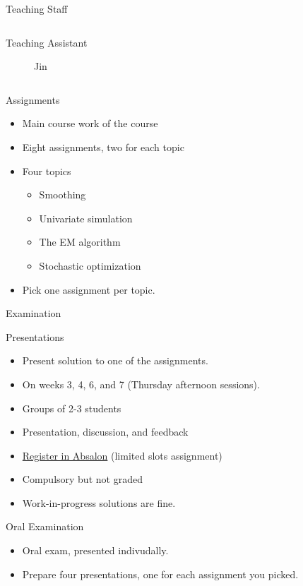 \documentclass[
  ignorenonframetext,
  aspectratio=1610,
  onlytextwidth]{beamer}
\providecommand{\tightlist}{}
\begin{document}
\begin{frame}{Teaching Staff}
\begin{columns}[T]
\begin{column}{0.47\linewidth}
\begin{block}{Teaching Assistant}
\begin{figure}[H]
{}

\caption{Jin}

\end{figure}%
\end{block}
\end{column}
\end{columns}
\end{frame}

\begin{frame}{Assignments}
\label{assignments}
\begin{itemize}[<+->]
\tightlist
\item
  Main course work of the course
\item
  Eight assignments, two for each topic
\item
  Four topics

  \begin{itemize}[<+->]
  \tightlist
  \item
    Smoothing
  \item
    Univariate simulation
  \item
    The EM algorithm
  \item
    Stochastic optimization
  \end{itemize}
\item
  Pick one assignment per topic.
\end{itemize}
\end{frame}

\begin{frame}{Examination}
\label{examination}
\begin{block}{Presentations}
\label{presentations}
\begin{itemize}[<+->]
\tightlist
\item
  Present solution to one of the assignments.
\item
  On weeks 3, 4, 6, and 7 (Thursday afternoon sessions).
\item
  Groups of 2-3 students
\item
  Presentation, discussion, and feedback
\item
  \href{https://absalon.ku.dk/courses/76985/groups\#tab-25490}{Register
  in Absalon} (limited slots assignment)
\item
  Compulsory but not graded
\item
  Work-in-progress solutions are fine.
\end{itemize}

\pause
\end{block}

\begin{block}{Oral Examination}
\label{oral-examination}
\begin{itemize}[<+->]
\tightlist
\item
  Oral exam, presented indivudally.
\item
  Prepare four presentations, one for each assignment you picked.
\end{itemize}
\end{block}
\end{frame}
\end{document}
